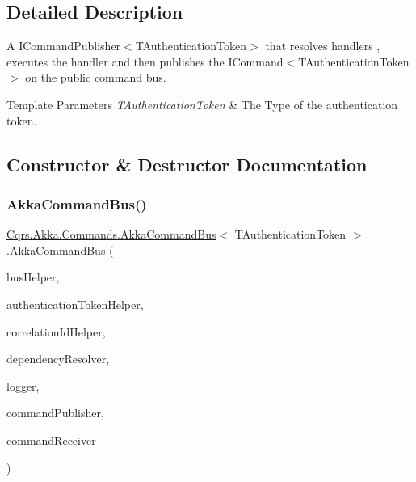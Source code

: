 \subsection{Detailed Description}
A I\+Command\+Publisher$<$\+T\+Authentication\+Token$>$ that resolves handlers , executes the handler and then publishes the I\+Command$<$\+T\+Authentication\+Token$>$ on the public command bus. 


\begin{DoxyTemplParams}{Template Parameters}
{\em T\+Authentication\+Token} & The Type of the authentication token.\\
\hline
\end{DoxyTemplParams}


\subsection{Constructor \& Destructor Documentation}
\mbox{\label{classCqrs_1_1Akka_1_1Commands_1_1AkkaCommandBus_a255b78be5cb216dcd30e2d2dd1240c06_a255b78be5cb216dcd30e2d2dd1240c06}} 
\subsubsection{\texorpdfstring{Akka\+Command\+Bus()}{AkkaCommandBus()}}
{\footnotesize\ttfamily \hyperlink{classCqrs_1_1Akka_1_1Commands_1_1AkkaCommandBus}{Cqrs.\+Akka.\+Commands.\+Akka\+Command\+Bus}$<$ T\+Authentication\+Token $>$.\hyperlink{classCqrs_1_1Akka_1_1Commands_1_1AkkaCommandBus}{Akka\+Command\+Bus} (\begin{DoxyParamCaption}\item[{\hyperlink{interfaceCqrs_1_1Bus_1_1IBusHelper}{I\+Bus\+Helper}}]{bus\+Helper,  }\item[{\hyperlink{interfaceCqrs_1_1Authentication_1_1IAuthenticationTokenHelper}{I\+Authentication\+Token\+Helper}$<$ T\+Authentication\+Token $>$}]{authentication\+Token\+Helper,  }\item[{I\+Correlation\+Id\+Helper}]{correlation\+Id\+Helper,  }\item[{\hyperlink{interfaceCqrs_1_1Configuration_1_1IDependencyResolver}{I\+Dependency\+Resolver}}]{dependency\+Resolver,  }\item[{I\+Logger}]{logger,  }\item[{\hyperlink{interfaceCqrs_1_1Commands_1_1ICommandPublisher}{I\+Command\+Publisher}$<$ T\+Authentication\+Token $>$}]{command\+Publisher,  }\item[{\hyperlink{interfaceCqrs_1_1Commands_1_1ICommandReceiver}{I\+Command\+Receiver}$<$ T\+Authentication\+Token $>$}]{command\+Receiver }\end{DoxyParamCaption})}



